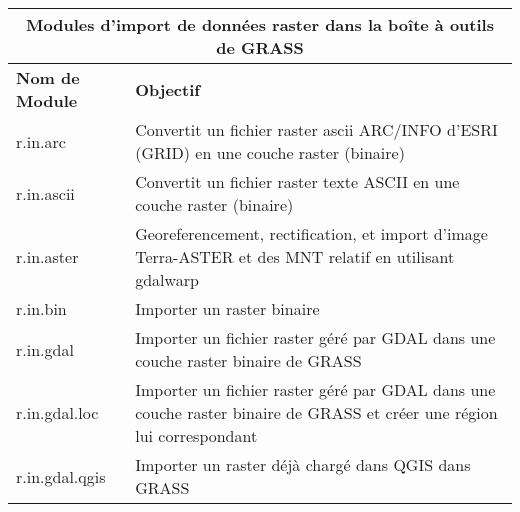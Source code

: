 \begin{center}
 \begin{tabular}{|p{2.5cm}|p{11.5cm}|}
  \hline \multicolumn{2}{|c|}{\textbf{Modules d'import de données raster dans la boîte à outils de GRASS}} \\ 
  \hline \textbf{Nom de Module} & \textbf{Objectif} \\
   \hline r.in.arc & Convertit un fichier raster ascii ARC/INFO d'ESRI (GRID) en une couche raster (binaire) \\
  \hline r.in.ascii & Convertit un fichier raster texte ASCII en une couche raster (binaire)\\
  \hline r.in.aster & Georeferencement, rectification, et import d'image Terra-ASTER et des MNT relatif en utilisant gdalwarp \\
   \hline r.in.bin & Importer un raster binaire \\
   \hline r.in.gdal &  Importer un fichier raster géré par GDAL dans une couche raster binaire de GRASS\\
  \hline r.in.gdal.loc &  Importer un fichier raster géré par GDAL dans une couche raster binaire de GRASS et créer une région lui correspondant\\
  \hline r.in.gdal.qgis & Importer un raster déjà chargé dans QGIS dans GRASS \\

\end{tabular}
\end{center}
